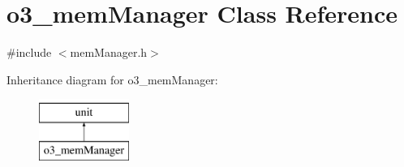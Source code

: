 \hypertarget{classo3__memManager}{
\section{o3\_\-memManager Class Reference}
\label{classo3__memManager}
}


{\ttfamily \#include $<$memManager.h$>$}

Inheritance diagram for o3\_\-memManager:\begin{figure}[H]
\begin{center}
\leavevmode
\includegraphics[height=2.000000cm]{classo3__memManager}
\end{center}
\end{figure}
